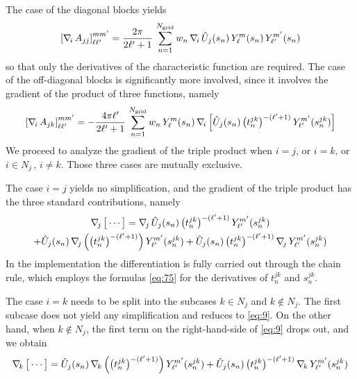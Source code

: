 The case of the diagonal blocks yields
\[
{[\nabla_{\!i}\, A_{jj}]}_{\ell \ell'}^{mm'} = \frac{2\pi}{2 \ell' + 1} \,\sum_{n=1}^{N_\text{grid}} w_n \, \nabla_{\!i}\, \hat{U}_j(s_n)  \,Y_\ell^m(s_n) \,  Y_{\ell'}^{m'}(s_n)
\]
so that only the derivatives of the characteristic function are required. The case of the off-diagonal blocks is significantly more involved, since it involves the gradient of the product of three functions, namely
\begin{equation}\label{eq:7}
{[\nabla_{\!i}\,A_{jk}]}_{\ell \ell'}^{mm'} = -  \frac{4 \pi \ell'}{2 \ell'+1} \, \sum_{n = 1}^{N_\text{grid}} w_n\, Y_\ell^m(s_n) \,\nabla_{\!i}\, \Big[ \hat{U}_j(s_n)  \,  \big( t_n^{jk}\big)^{-(\ell'+1)} \, Y_{\ell'}^{m'} (s_n^{jk}) \Big]
\end{equation}
We proceed to analyze the gradient of the triple product when $i = j$, or $i = k$, or $i \in N_j \, , \, i \not= k$. Those three cases are mutually exclusive.

The case $i = j$ yields no simplification, and the gradient of the triple product has the three standard contributions, namely
\begin{multline}\label{eq:9}
\nabla_{\!j}\, \big[ \cdots \big] = \nabla_{\!j}\, \hat{U}_j(s_n)  \,  \big( t_n^{jk}\big)^{-(\ell'+1)} \, Y_{\ell'}^{m'} (s_n^{jk}) \\
+ \hat{U}_j(s_n)  \, \nabla_{\!j}\, \Big(  \big( t_n^{jk}\big)^{-(\ell'+1)} \Big) \, Y_{\ell'}^{m'} (s_n^{jk}) +  \hat{U}_j(s_n)  \,  \big( t_n^{jk}\big)^{-(\ell'+1)} \, \nabla_{\!j}\, Y_{\ell'}^{m'} (s_n^{jk})
\end{multline}
In the implementation the differentiation is fully carried out through the chain rule, which employs the formulas \eqref{eq:75} for the derivatives of $t_n^{jk}$ and $s_n^{jk}$.

The case $i =k$ needs to be split into the subcases $k \in N_j$ and $k \not \in N_j$. The first subcase does not yield any simplification and reduces to \eqref{eq:9}. On the other hand, when $k \not\in N_j$, the first term on the right-hand-side of \eqref{eq:9} drops out, and we obtain
\[
\nabla_{\!k}\, \big[ \cdots \big] = 
 \hat{U}_j(s_n)  \, \nabla_{\!k}\, \Big(  \big( t_n^{jk}\big)^{-(\ell'+1)} \Big) \, Y_{\ell'}^{m'} (s_n^{jk}) +  \hat{U}_j(s_n)  \,  \big( t_n^{jk}\big)^{-(\ell'+1)} \, \nabla_{\!k}\, Y_{\ell'}^{m'} (s_n^{jk})
\]

